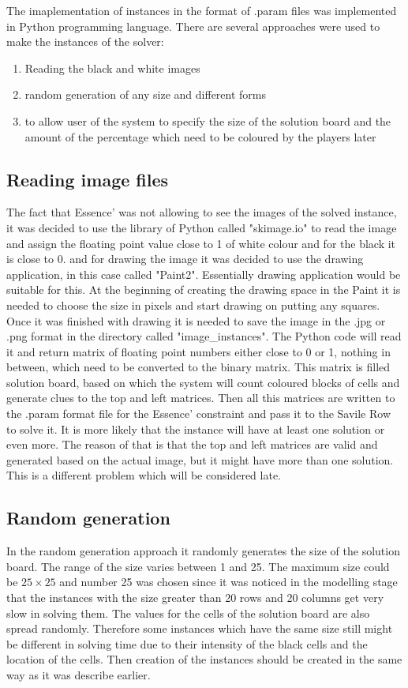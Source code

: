 The imaplementation of instances in the format of .param files was implemented in Python programming language. There are several approaches were used to make the instances of the solver:

\begin{enumerate}
\item Reading the black and white images
\item random generation of any size and different forms
\item to allow user of the system to specify the size of the solution board and the amount of the percentage which need to be coloured by the players later
\end{enumerate}

\subsection{Reading image files}
\label{subsec:read_images}
The fact that Essence' was not allowing to see the images of the solved instance, it was decided to use the library of Python called "skimage.io" to read the image and assign the floating point value close to 1 of white colour and for the black it is close to 0. and for drawing the image it was decided to use the drawing application, in this case called "Paint2". Essentially drawing application would be suitable for this. At the beginning of creating the drawing space in the Paint it is needed to choose the size in pixels and start drawing on putting any squares. Once it was finished with drawing it is needed to save the image in the .jpg or .png format in the directory called "image\_instances". The Python code will read it and return matrix of floating point numbers either close to 0 or 1, nothing in between, which need to be converted to the binary matrix. This matrix is filled solution board, based on which the system will count coloured blocks of cells and generate clues to the top and left matrices. Then all this matrices are written to the .param format file for the Essence' constraint and pass it to the Savile Row to solve it. It is more likely that the instance will have at least one solution or even more. The reason of that is that the top and left matrices are valid and generated based on the actual image, but it might have more than one solution. This is a different problem which will be considered late. 

\subsection{Random generation}
\label{subsec:rand_generation}
In the random generation approach it randomly generates the size of the solution board. The range of the size varies between 1 and 25. The maximum size could be $25\times25$ and number 25 was chosen since it was noticed in the modelling stage that the instances with the size greater than 20 rows and 20 columns get very slow in solving them. The values for the cells of the solution board are also spread randomly. Therefore some instances which have the same size still might be different in solving time due to their intensity of the black cells and the location of the cells. Then creation of the instances should be created in the same way as it was describe earlier. 


